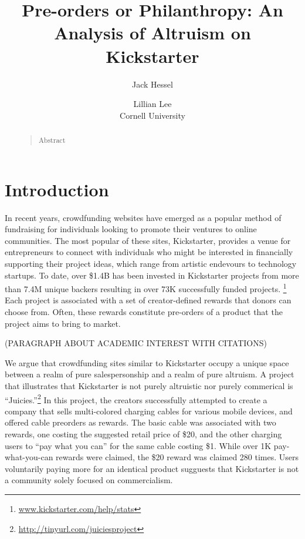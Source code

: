 \documentclass[letterpaper]{article}
\begin{document}
%
\title{Pre-orders or Philanthropy: An Analysis of Altruism on Kickstarter}
\author{Jack Hessel \and Lillian Lee\\Cornell University}
\maketitle
\begin{abstract}
\begin{quote}
Abstract
\end{quote}
\end{abstract}

\section{Introduction}

In recent years, crowdfunding websites have emerged as a popular method of fundraising for individuals looking to promote their ventures to online communities. The most popular of these sites, Kickstarter, provides a venue for entrepreneurs to connect with individuals who might be interested in financially supporting their project ideas, which range from artistic endevours to technology startups. To date, over \$1.4B has been invested in Kickstarter projects from more than 7.4M unique backers resulting in over 73K successfully funded projects. \footnote{ \url{www.kickstarter.com/help/stats}} Each project is associated with a set of creator-defined rewards that donors can choose from. Often, these rewards constitute pre-orders of a product that the project aims to bring to market.

(PARAGRAPH ABOUT ACADEMIC INTEREST WITH CITATIONS)

We argue that crowdfunding sites similar to Kickstarter occupy a unique space between a realm of pure salespersonship and a realm of pure altruism. A project that illustrates that Kickstarter is not purely altruistic nor purely commerical is ``Juicies.''\footnote{\url{http://tinyurl.com/juiciesproject}} In this project, the creators successfully attempted to create a company that sells multi-colored charging cables for various mobile devices, and offered cable preorders as rewards. The basic cable was associated with two rewards, one costing the suggested retail price of \$20, and the other charging users to ``pay what you can'' for the same cable costing \$1. While over 1K pay-what-you-can rewards were claimed, the \$20 reward was claimed 280 times. Users voluntarily paying more for an identical product sugguests that Kickstarter is not a community solely focused on commercialism.
\end{document}
